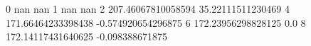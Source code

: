 0 nan nan
1 nan nan
2 207.46067810058594 35.22111511230469
4 171.66464233398438 -0.574920654296875
6 172.23956298828125 0.0
8 172.14117431640625 -0.098388671875
